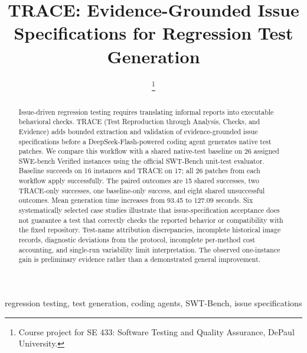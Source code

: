\documentclass[conference]{IEEEtran}
\title{TRACE: Evidence-Grounded Issue Specifications for Regression Test Generation}
\author{
\IEEEauthorblockN{Mark Koehler}
\IEEEauthorblockA{DePaul University\\mkoehle6@depaul.edu}
\and
\IEEEauthorblockN{Hikaru McGuan}
\IEEEauthorblockA{DePaul University\\hmcguan@depaul.edu}
\and
\IEEEauthorblockN{Jason Torres}
\IEEEauthorblockA{DePaul University\\jtorr138@depaul.edu}
\thanks{Course project for SE 433: Software Testing and Quality Assurance, DePaul University.}
}
\begin{document}
\maketitle
\begin{abstract}
Issue-driven regression testing requires translating informal reports into executable behavioral checks. TRACE (Test Reproduction through Analysis, Checks, and Evidence) adds bounded extraction and validation of evidence-grounded issue specifications before a DeepSeek-Flash-powered coding agent generates native test patches. We compare this workflow with a shared native-test baseline on 26 assigned SWE-bench Verified instances using the official SWT-Bench unit-test evaluator. Baseline succeeds on 16 instances and TRACE on 17; all 26 patches from each workflow apply successfully. The paired outcomes are 15 shared successes, two TRACE-only successes, one baseline-only success, and eight shared unsuccessful outcomes. Mean generation time increases from 93.45 to 127.09 seconds. Six systematically selected case studies illustrate that issue-specification acceptance does not guarantee a test that correctly checks the reported behavior or compatibility with the fixed repository. Test-name attribution discrepancies, incomplete historical image records, diagnostic deviations from the protocol, incomplete per-method cost accounting, and single-run variability limit interpretation. The observed one-instance gain is preliminary evidence rather than a demonstrated general improvement.
\end{abstract}
\begin{IEEEkeywords}
regression testing, test generation, coding agents, SWT-Bench, issue specifications
\end{IEEEkeywords}


\appendices

\end{document}
